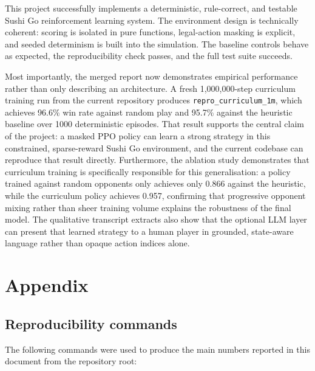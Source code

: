 \documentclass[10pt]{article}
\begin{document}
This project successfully implements a deterministic, rule-correct, and testable Sushi Go reinforcement learning system. The environment design is technically coherent: scoring is isolated in pure functions, legal-action masking is explicit, and seeded determinism is built into the simulation. The baseline controls behave as expected, the reproducibility check passes, and the full test suite succeeds.

Most importantly, the merged report now demonstrates empirical performance rather than only describing an architecture. A fresh 1,000,000-step curriculum training run from the current repository produces \texttt{repro\_curriculum\_1m}, which achieves 96.6\% win rate against random play and 95.7\% against the heuristic baseline over 1000 deterministic episodes. That result supports the central claim of the project: a masked PPO policy can learn a strong strategy in this constrained, sparse-reward Sushi Go environment, and the current codebase can reproduce that result directly. Furthermore, the ablation study demonstrates that curriculum training is specifically responsible for this generalisation: a policy trained against random opponents only achieves only 0.866 against the heuristic, while the curriculum policy achieves 0.957, confirming that progressive opponent mixing rather than sheer training volume explains the robustness of the final model. The qualitative transcript extracts also show that the optional LLM layer can present that learned strategy to a human player in grounded, state-aware language rather than opaque action indices alone.

\appendix
\section{Appendix}

\subsection{Reproducibility commands}

The following commands were used to produce the main numbers reported in this document from the repository root:
\end{document}
